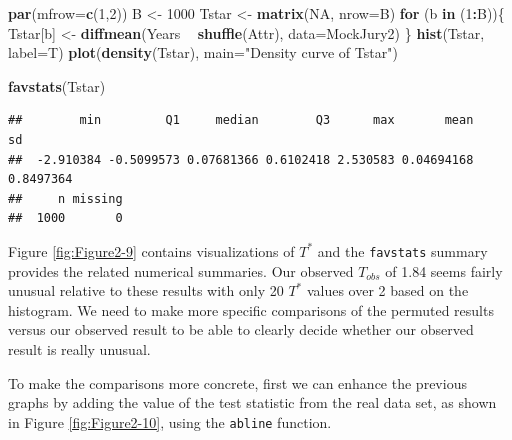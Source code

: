 \documentclass[]{book}
\newenvironment{Shaded}{\begin{snugshade}}{\end{snugshade}}
\newcommand{\KeywordTok}[1]{\textcolor[rgb]{0.13,0.29,0.53}{\textbf{#1}}}
\newcommand{\DataTypeTok}[1]{\textcolor[rgb]{0.13,0.29,0.53}{#1}}
\newcommand{\DecValTok}[1]{\textcolor[rgb]{0.00,0.00,0.81}{#1}}
\newcommand{\StringTok}[1]{\textcolor[rgb]{0.31,0.60,0.02}{#1}}
\newcommand{\OtherTok}[1]{\textcolor[rgb]{0.56,0.35,0.01}{#1}}
\newcommand{\ControlFlowTok}[1]{\textcolor[rgb]{0.13,0.29,0.53}{\textbf{#1}}}
\newcommand{\OperatorTok}[1]{\textcolor[rgb]{0.81,0.36,0.00}{\textbf{#1}}}
\newcommand{\NormalTok}[1]{#1}
\theoremstyle{definition}
\theoremstyle{definition}
\theoremstyle{remark}
\begin{document}
\begin{Shaded}
\begin{Highlighting}[]
\KeywordTok{par}\NormalTok{(}\DataTypeTok{mfrow=}\KeywordTok{c}\NormalTok{(}\DecValTok{1}\NormalTok{,}\DecValTok{2}\NormalTok{))}
\NormalTok{B <-}\StringTok{ }\DecValTok{1000}
\NormalTok{Tstar <-}\StringTok{ }\KeywordTok{matrix}\NormalTok{(}\OtherTok{NA}\NormalTok{, }\DataTypeTok{nrow=}\NormalTok{B)}
\ControlFlowTok{for}\NormalTok{ (b }\ControlFlowTok{in}\NormalTok{ (}\DecValTok{1}\OperatorTok{:}\NormalTok{B))\{}
\NormalTok{  Tstar[b] <-}\StringTok{ }\KeywordTok{diffmean}\NormalTok{(Years }\OperatorTok{~}\StringTok{ }\KeywordTok{shuffle}\NormalTok{(Attr), }\DataTypeTok{data=}\NormalTok{MockJury2)}
\NormalTok{\}}
\KeywordTok{hist}\NormalTok{(Tstar, }\DataTypeTok{label=}\NormalTok{T)}
\KeywordTok{plot}\NormalTok{(}\KeywordTok{density}\NormalTok{(Tstar), }\DataTypeTok{main=}\StringTok{"Density curve of Tstar"}\NormalTok{)}
\end{Highlighting}
\end{Shaded}

\begin{Shaded}
\begin{Highlighting}[]
\KeywordTok{favstats}\NormalTok{(Tstar)}
\end{Highlighting}
\end{Shaded}

\begin{verbatim}
##        min         Q1     median        Q3      max       mean        sd
##  -2.910384 -0.5099573 0.07681366 0.6102418 2.530583 0.04694168 0.8497364
##     n missing
##  1000       0
\end{verbatim}

Figure \ref{fig:Figure2-9} contains visualizations of \(T^*\) and the
\texttt{favstats} summary provides the related numerical summaries. Our
observed \(T_{obs}\) of 1.84 seems fairly unusual relative to these
results with only 20 \(T^*\) values over 2 based on the histogram. We
need to make more specific comparisons of the permuted results versus
our observed result to be able to clearly decide whether our observed
result is really unusual.

To make the comparisons more concrete, first we can enhance the previous
graphs by adding the value of the test statistic from the real data set,
as shown in Figure \ref{fig:Figure2-10}, using the \texttt{abline}
function.
\end{document}
